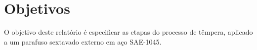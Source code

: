 \section{Objetivos}
\label{Objetivos}

O objetivo deste relatório é especificar as etapas do processo de têmpera, aplicado a um parafuso sextavado externo em aço SAE-1045.



